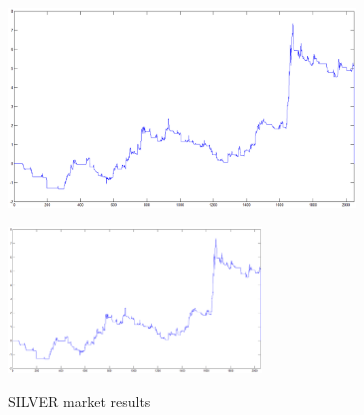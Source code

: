 \documentclass{tewiart}
\begin{document}
\begin{figure}[h]
\begin{minipage}{.49\linewidth}
\label{cztero}
\end{minipage}
\begin{minipage}{.49\linewidth}
\centering
\includegraphics[width=0.82\textwidth]{images/silverD.eps}
\label{mansard}
\end{minipage}
\begin{minipage}{\linewidth}
\centering
\includegraphics[width=0.6\textwidth]{images/silverS.eps}
\label{mansard}
\end{minipage}
\caption{SILVER market results}
\end{figure}
\FloatBarrier








\end{document}
